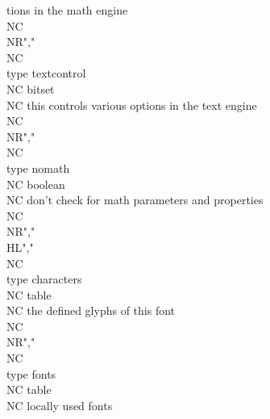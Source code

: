 tions in the math engine \\NC \\NR","\\NC \\type {textcontrol}        \\NC bitset  \\NC this controls various options in the text engine \\NC \\NR","\\NC \\type {nomath}             \\NC boolean \\NC don't check for math parameters and properties   \\NC \\NR","\\HL","\\NC \\type {characters}         \\NC table   \\NC the defined glyphs of this font \\NC \\NR","\\NC \\type {fonts}              \\NC table   \\NC locally used fonts    